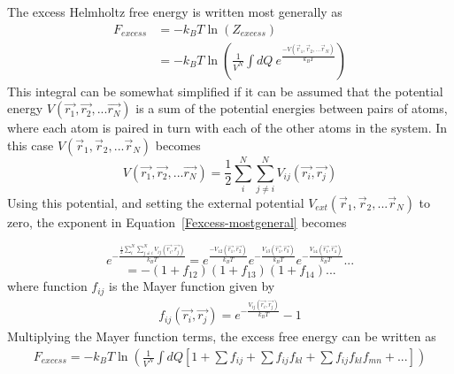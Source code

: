 \documentclass[double,12pt]{beavtex}
\begin{document}
The excess Helmholtz free energy is written most generally as
\begin{align}
      F_{excess} &= -k_{B}T\ln(Z_{excess}) \\
                 &= -k_BT\ln{\left(\frac{1}{V^N}\int{dQ}~e^\frac{-V(\vec{r}_1, \vec{r}_2,...\vec{r}_N)}{k_BT}\right)} \label{Fexcess-mostgeneral}
\end{align} 
This integral can be somewhat simplified if it can be assumed that the 
potential energy $V(\vec{r_1},\vec{r_2},...\vec{r_N})$ is a sum of the 
potential energies between pairs of atoms, where each atom is paired in 
turn with each of the other atoms in the system. In this case 
$V(\vec{r}_1, \vec{r}_2,...\vec{r}_N)$ becomes 
\begin{equation}{V(\vec{r_1},\vec{r_2},...\vec{r_N})=\frac{1}{2}\sum^N_i\sum^N_{j\neq{i}}V_{ij}(\vec{r_i},\vec{r_j})}\end{equation} 
Using this potential, and setting the external potential 
$V_{ext}(\vec{r}_1, \vec{r}_2,...\vec{r}_N)$ to zero, the exponent in 
Equation~\ref{Fexcess-mostgeneral} becomes

\begin{equation}{e^{-\frac{\frac{1}{2}\sum^N_i\sum^N_{j\neq{i}}V_{ij}(\vec{r_i},
\vec{r_j})}{k_BT}}=e^{\frac{-V_{12}(\vec{r_1},\vec{r_2})}{k_BT}}e^{-\frac{V_{13}
(\vec{r_1},\vec{r_3})}{k_BT}}e^{-\frac{V_{14}(\vec{r_1},\vec{r_4})}{k_BT}}...}\end{equation}
\begin{equation}{=-(1+f_{12})(1+f_{13})(1+f_{14})...}\end{equation}
where function $f_{ij}$ is the Mayer function given by
\begin{align}\label{eq:mayerfunction}
     f_{ij}(\vec{r_i},\vec{r_j})=e^{-\frac{V_{ij}(\vec{r_i},\vec{r_j})}{k_BT}}-1
\end{align} 
Multiplying the Mayer function terms, the excess free energy can be 
written as~\cite{schroeder}
\begin{align} \label{eq:Fexcess-simplified}
    F_{excess}=-k_BT\ln{\left(\frac{1}{V^N}\int{dQ}\left[1 + \sum{f_{ij}} + \sum{f_{ij}f_{kl}} +\sum{f_{ij}f_{kl}f_{mn}} +... \right]\right)}
\end{align}
\end{document}
